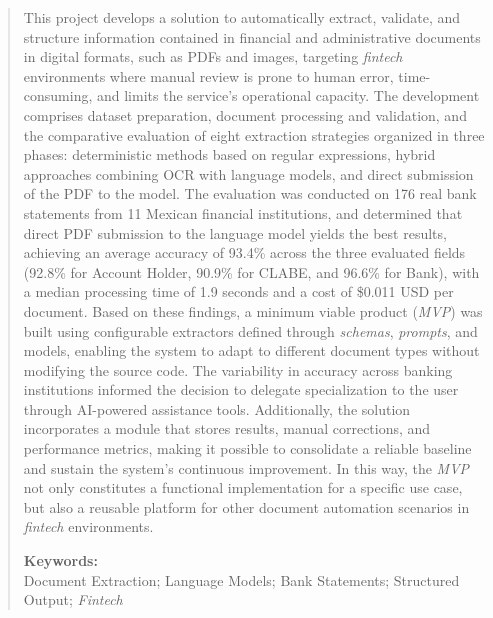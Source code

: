 \begin{abstract}
This project develops a solution to automatically extract, validate, and structure information contained in financial and administrative documents in digital formats, such as PDFs and images, targeting \textit{fintech} environments where manual review is prone to human error, time-consuming, and limits the service's operational capacity. The development comprises dataset preparation, document processing and validation, and the comparative evaluation of eight extraction strategies organized in three phases: deterministic methods based on regular expressions, hybrid approaches combining OCR with language models, and direct submission of the PDF to the model. The evaluation was conducted on 176 real bank statements from 11 Mexican financial institutions, and determined that direct PDF submission to the language model yields the best results, achieving an average accuracy of 93.4\% across the three evaluated fields (92.8\% for Account Holder, 90.9\% for CLABE, and 96.6\% for Bank), with a median processing time of 1.9 seconds and a cost of \$0.011 USD per document. Based on these findings, a minimum viable product (\textit{MVP}) was built using configurable extractors defined through \textit{schemas}, \textit{prompts}, and models, enabling the system to adapt to different document types without modifying the source code. The variability in accuracy across banking institutions informed the decision to delegate specialization to the user through AI-powered assistance tools. Additionally, the solution incorporates a module that stores results, manual corrections, and performance metrics, making it possible to consolidate a reliable baseline and sustain the system's continuous improvement. In this way, the \textit{MVP} not only constitutes a functional implementation for a specific use case, but also a reusable platform for other document automation scenarios in \textit{fintech} environments.

\noindent \textbf{Keywords:}\\
\noindent Document Extraction; Language Models; Bank Statements; Structured Output; \textit{Fintech}
\end{abstract}

